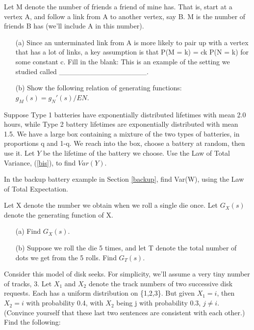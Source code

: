 Let M denote the number of friends a friend of mine has. That is, start
at a vertex A, and follow a link from A to another vertex, say B. M is
the number of friends B has (we'll include A in this number).

\begin{itemize}

\item [(a)] Since an unterminated link from A is more likely to pair up
with a vertex that has a lot of links, a key assumption is that P(M = k)
= ck P(N = k) for some constant c. Fill in the blank: This is an example
of the setting we studied called \_\_\_\_\_\_\_\_\_\_\_\_\_\_\_\_\_.

\item [(b)] Show the following relation of generating functions: $g_M(s)
= g_N'(s)/EN$. 

\end{itemize}

\oneproblem
Suppose Type 1 batteries have exponentially distributed lifetimes with
mean 2.0 hours, while Type 2 battery lifetimes are exponentially
distributed with mean 1.5.  We have a large box containing a mixture of
the two types of batteries, in proportions q and 1-q.  We reach into the
box, choose a battery at random, then use it.  Let $Y$ be the lifetime
of the battery we choose.  Use the Law of Total Variance, (\ref{bis}),
to find $Var(Y)$.


\oneproblem
In the backup battery example in Section \ref{backup}, find Var(W),
using the Law of Total Expectation.

\oneproblem
Let X denote the number we obtain when we roll a single die
once.  Let $G_X(s)$ denote the generating function of X.

\begin{itemize}

\item [(a)] Find $G_X(s)$.

\item [(b)] Suppose we roll the die 5 times, and let T denote the
total number of dots we get from the 5 rolls.  Find $G_T(s)$.

\end{itemize}

\oneproblem
Consider this model of disk seeks. For simplicity, we'll assume a very
tiny number of tracks, 3. Let $X_1$ and $X_2$ denote the track numbers
of two successive disk requests. Each has a uniform distribution on
\{1,2,3\}. But given $X_1 = i$, then $X_2 = i$ with probability 0.4, with
$X_2$ being j with probability 0.3, $j \neq i$. (Convince yourself that
these last two sentences are consistent with each other.) Find the
following:

